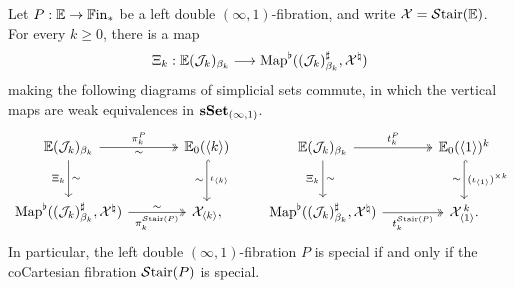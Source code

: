 \documentclass[10pt,reqno]{amsart}
\begin{document}
\begin{theorem}
\label{thm:staircase_preserves_reflects_specialness}
Let $P:\mathbb E\to\mathbb{F}\mathrm{in}_*$ be a left double
$(\infty,1)$-fibration, and write $\mathcal X=\mathcal{S}\mathrm{tair}(\mathbb E)$.
For every $k\geq0$, there is a map
\[
\Xi_k:\mathbb E(\mathcal J_k)_{\beta_k}
 \longrightarrow
 \operatorname{Map}^\flat((\mathcal J_k)^\sharp_{\beta_k},\mathcal X^\natural)
\]
making the following diagrams of simplicial sets commute, in which the
vertical maps are weak equivalences in $\mathbf{sSet}_{(\infty,1)}$.
\begin{equation}
\label{eq:staircase_specialness_diagram}
\begin{gathered}
\begin{tikzcd}[ampersand replacement=\&, sep=large]
\mathbb E(\mathcal J_k)_{\beta_k}
 \arrow[r,two heads,"\pi_k^P","\sim"']
 \arrow[d,"\Xi_k"',"\sim"]
\&\mathbb E_0(\langle k\rangle)
 \arrow[d,hook,"\iota_{\langle k\rangle}","\sim"']\\
\Map^\flat((\mathcal J_k)^\sharp_{\beta_k},\mathcal X^\natural)
 \arrow[r,two heads,"\pi_k^{\Stair(P)}"',"\sim"]
\&\mathcal X_{\langle k\rangle},
\end{tikzcd}
\qquad
\begin{tikzcd}[ampersand replacement=\&, sep=large]
\mathbb E(\mathcal J_k)_{\beta_k}
 \arrow[r,two heads,"t_k^P"]\arrow[d,"\Xi_k"',"\sim"]
\&\mathbb E_0(\langle1\rangle)^k
 \arrow[d,hook,"(\iota_{\langle1\rangle})^{\times k}","\sim"']\\
\Map^\flat((\mathcal J_k)^\sharp_{\beta_k},\mathcal X^\natural)
 \arrow[r,two heads,"t_k^{\Stair(P)}"']
\&\mathcal X_{\langle1\rangle}^{\,k}.
\end{tikzcd}
\end{gathered}
\end{equation}
In particular, the left double $(\infty,1)$-fibration $P$ is
special if and only if the coCartesian fibration $\mathcal{S}\mathrm{tair}(P)$ is
special.
\end{theorem}
\end{document}
